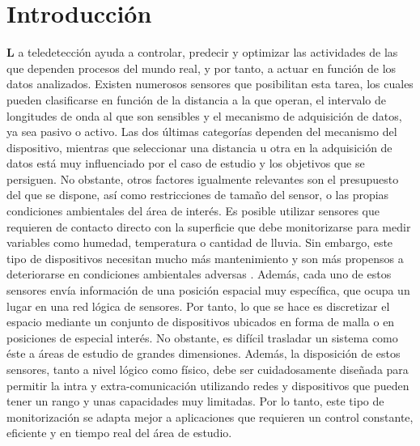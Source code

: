 \setchapterpreamble[u]{\margintoc}
\chapter*{Introducción}
\label{sec:introduction_spanish}

\lettrine[findent=0pt, lines=3]{\textbf{L}}{ }a teledetección ayuda a controlar, predecir y optimizar las actividades de las que dependen procesos del mundo real, y por tanto, a actuar en función de los datos analizados. Existen numerosos sensores que posibilitan esta tarea, los cuales pueden clasificarse en función de la distancia a la que operan, el intervalo de longitudes de onda al que son sensibles y el mecanismo de adquisición de datos, ya sea pasivo o activo. Las dos últimas categorías dependen del mecanismo del dispositivo, mientras que seleccionar una distancia u otra en la adquisición de datos está muy influenciado por el caso de estudio y los objetivos que se persiguen. No obstante, otros factores igualmente relevantes son el presupuesto del que se dispone, así como restricciones de tamaño del sensor, o las propias condiciones ambientales del área de interés. Es posible utilizar sensores que requieren de contacto directo con la superficie que debe monitorizarse para medir variables como humedad, temperatura o cantidad de lluvia. Sin embargo, este tipo de dispositivos necesitan mucho más mantenimiento y son más propensos a deteriorarse en condiciones ambientales adversas \cite{silva_low-cost_2019, morais_versatile_2021}. Además, cada uno de estos sensores envía información de una posición espacial muy específica, que ocupa un lugar en una red lógica de sensores. Por tanto, lo que se hace es discretizar el espacio mediante un conjunto de dispositivos ubicados en forma de malla o en posiciones de especial interés. No obstante, es difícil trasladar un sistema como éste a áreas de estudio de grandes dimensiones. Además, la disposición de estos sensores, tanto a nivel lógico como físico, debe ser cuidadosamente diseñada para permitir la intra y extra-comunicación utilizando redes y dispositivos que pueden tener un rango y unas capacidades muy limitadas. Por lo tanto, este tipo de monitorización se adapta mejor a aplicaciones que requieren un control constante, eficiente y en tiempo real del área de estudio. 

